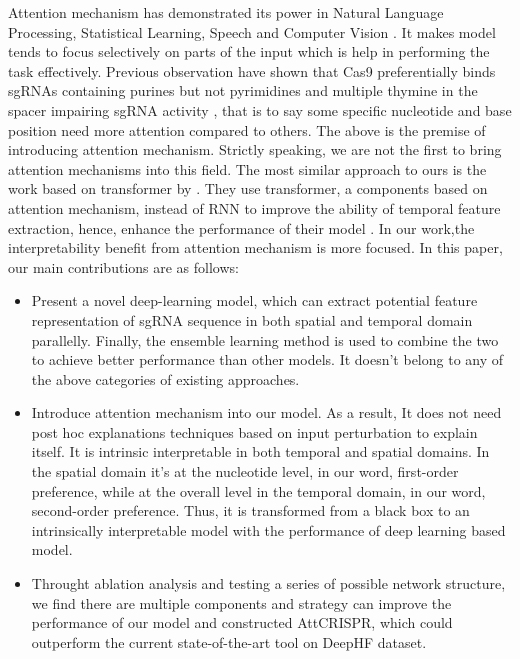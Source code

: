 \documentclass{bioinfo}
\begin{document}
Attention mechanism has demonstrated its power in Natural Language Processing, Statistical Learning, Speech and Computer Vision \citep{chaudhari2019an}. 
 It makes model tends to focus selectively on parts of the input which is help in performing the task effectively. 
 Previous observation have shown that Cas9 preferentially binds sgRNAs containing purines but not pyrimidines \citep{wang2014genetic} and multiple thymine in the spacer impairing sgRNA activity \citep{wu2014genome-wide}, 
 that is to say some specific nucleotide and base position need more attention compared to others. 
 The above is the premise of introducing attention mechanism. Strictly speaking, we are not the first to bring attention mechanisms into this field. 
 The most similar approach to ours is the work based on transformer by \citeauthor{Liu2019}. 
 They use transformer, a components based on attention mechanism, instead of RNN to improve the ability of temporal feature extraction, 
 hence, enhance the performance of their model \citep{Liu2019,vaswani2017attention}. 
 In our work,the interpretability benefit from attention mechanism is more focused.
 In this paper, our main contributions are as follows:\vspace*{1pt}
\begin{itemize}
    \item Present a novel deep-learning model, which can extract potential feature representation of sgRNA sequence in both spatial and temporal domain parallelly. 
    Finally, the ensemble learning method is used to combine the two to achieve better performance than other models.
    It doesn't belong to any of the above categories of existing approaches.
    \item Introduce attention mechanism into our model. 
    As a result, It does not need post hoc explanations techniques based on input perturbation to explain itself. 
    It is intrinsic interpretable in both temporal and spatial domains.
    In the spatial domain it's at the nucleotide level, in our word, first-order preference, 
    while at the overall level in the temporal domain, in our word, second-order preference. 
    Thus, it is transformed from a black box to an intrinsically interpretable model with the performance of deep learning based model. 
    \item Throught ablation analysis and testing a series of possible network structure, 
    we find there are multiple components and strategy can improve the performance of our model and constructed AttCRISPR, 
    which could outperform the current state-of-the-art tool on DeepHF dataset.\vspace*{1pt}
\end{itemize}
\end{document}
